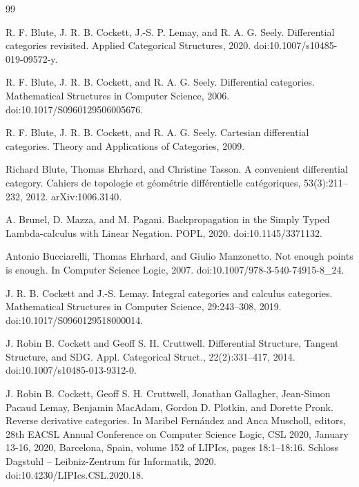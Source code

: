 \begin{thebibliography}{99}
\par\noindent    R. F. Blute, J. R. B. Cockett, J.-S. P. Lemay, and R. A. G. Seely.  Differential categories revisited.  Applied Categorical Structures, 2020.  doi:10.1007/s10485-019-09572-y.  

\par\noindent    R. F. Blute, J. R. B. Cockett, and R. A. G. Seely.  Differential categories.  Mathematical Structures in Computer Science, 2006.  doi:10.1017/S0960129506005676.  

\par\noindent    R. F. Blute, J. R. B. Cockett, and R. A. G. Seely.  Cartesian differential categories.  Theory and Applications of Categories, 2009.  

\par\noindent    Richard Blute, Thomas Ehrhard, and Christine Tasson.  A convenient differential category.  Cahiers de topologie et géométrie différentielle catégoriques, 53(3):211–232, 2012.  arXiv:1006.3140.  

\par\noindent    A. Brunel, D. Mazza, and M. Pagani.  Backpropagation in the Simply Typed Lambda-calculus with Linear Negation.  POPL, 2020.  doi:10.1145/3371132.  

\par\noindent    Antonio Bucciarelli, Thomas Ehrhard, and Giulio Manzonetto.  Not enough points is enough.  In Computer Science Logic, 2007.  doi:10.1007/978-3-540-74915-8\_24.  

\par\noindent    J. R. B. Cockett and J.-S. Lemay.  Integral categories and calculus categories.  Mathematical Structures in Computer Science, 29:243–308, 2019.  doi:10.1017/S0960129518000014.  

\par\noindent    J. Robin B. Cockett and Geoff S. H. Cruttwell.  Differential Structure, Tangent Structure, and SDG.  Appl. Categorical Struct., 22(2):331–417, 2014.  doi:10.1007/s10485-013-9312-0.  

\par\noindent    J. Robin B. Cockett, Geoff S. H. Cruttwell, Jonathan Gallagher, Jean-Simon Pacaud Lemay, Benjamin MacAdam, Gordon D. Plotkin, and Dorette Pronk.  Reverse derivative categories.  In Maribel Fernández and Anca Muscholl, editors, 28th EACSL Annual Conference on Computer Science Logic, CSL 2020, January 13-16, 2020, Barcelona, Spain, volume 152 of LIPIcs, pages 18:1–18:16. Schloss Dagstuhl – Leibniz-Zentrum für Informatik, 2020.  doi:10.4230/LIPIcs.CSL.2020.18.  


\end{thebibliography}
